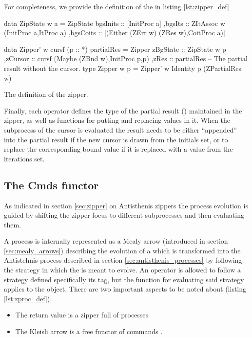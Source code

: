 For completeness, we provide the definition of the  in
listing \ref{lst:zipper_def}

\begin{code}
\begin{haskellcode}
 data ZipState w a =
  ZipState
  { bgsInits :: [InitProc a]
   ,bgsIts :: ZItAssoc w (InitProc a,ItProc a)
   ,bgsCoits :: [(Either (ZErr w) (ZRes w),CoitProc a)]
  }

data Zipper' w cursf (p :: *) partialRes =
  Zipper
  { zBgState :: ZipState w p
   ,zCursor  :: cursf (Maybe (ZBnd w),InitProc p,p)
   ,zRes     :: partialRes -- The partial result without the cursor.
  }
type Zipper w p = Zipper' w Identity p (ZPartialRes w)
\end{haskellcode}
  \caption{\label{lst:zipper_def}The definition of the zipper.}
\end{code}

Finally, each operator defines the type of the partial result ()
maintained in the zipper, as well as functions for putting and replacing values in
it. When the subprocess of the cursor is evaluated the result needs to
be either ``appended'' into the partial result if the new cursor is
drawn from the initials set, or to replace the corresponding bound
value if it is replaced with a value from the iterations set.

\subsection{The Cmds functor}
\label{sec:cmds_functor}

As indicated in section \ref{sec:zipper} on Antisthenis zippers
the process evolution is guided
by shifting the zipper focus to different subprocesses and then
evaluating them.

A process is internally represented as a Mealy arrow (introduced in
section \ref{sec:mealy_arrows}) describing the evolution of a
 which is transformed into the Antistehnis process
described in section \ref{sec:antisthenis_processes} by following the
strategy in which the  is meant to evolve. An operator is
allowed to follow a strategy defined specifically its
 tag, but the function for evaluating said strategy
applies to the  object. There are two important aspects to
be noted about  (listing \ref{lst:zproc_def}).

\begin{itemize}
\item The return value is a zipper full of processes 
\item The Kleisli arrow is a free functor of commands .
\end{itemize}

